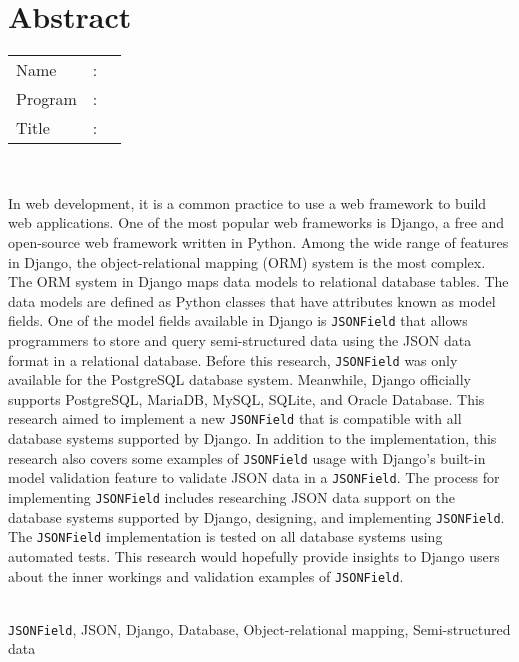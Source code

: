 %
%
%

\chapter*{Abstract}
\singlespacing

\vspace*{0.2cm}

\noindent \begin{tabular}{@{}l l p{12.0cm}}
	Name&: & \penulis \\
	Program&: & \program \\
	Title&: & \judulInggris \\
\end{tabular} \\

\vspace*{0.5cm}

\noindent
In web development, it is a common practice to use a web framework to build web
applications. One of the most popular web frameworks is Django, a free and
open-source web framework written in Python. Among the wide range of features
in Django, the object-relational mapping (ORM) system is the most complex. The
ORM system in Django maps data models to relational database tables. The data
models are defined as Python classes that have attributes known as model
fields. One of the model fields available in Django is \verb|JSONField| that
allows programmers to store and query semi-structured data using the JSON data
format in a relational database. Before this research, \verb|JSONField| was
only available for the PostgreSQL database system. Meanwhile, Django officially
supports PostgreSQL, MariaDB, MySQL, SQLite, and Oracle Database. This research
aimed to implement a new \verb|JSONField| that is compatible with all database
systems supported by Django. In addition to the implementation, this research
also covers some examples of \verb|JSONField| usage with Django's built-in
model validation feature to validate JSON data in a \verb|JSONField|.
The process for implementing \verb|JSONField| includes researching JSON data
support on the database systems supported by Django, designing, and
implementing \verb|JSONField|. The \verb|JSONField| implementation is tested on
all database systems using automated tests. This research would hopefully
provide insights to Django users about the inner workings and validation
examples of \verb|JSONField|.\\

\vspace*{0.2cm}

\noindent {} \\
\verb|JSONField|, JSON, Django, Database, Object-relational mapping,
Semi-structured data \\

\onehalfspacing
\newpage
